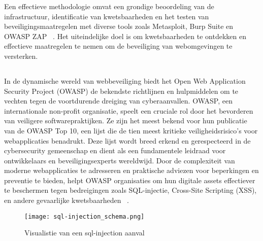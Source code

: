 Een effectieve methodologie omvat een grondige beoordeling van de infrastructuur, identificatie van kwetsbaarheden en het 
testen van beveiligingsmaatregelen met diverse tools zoals Metasploit, Burp Suite en OWASP ZAP ~\autocite{Ravindran2022}. 
Het uiteindelijke doel is om kwetsbaarheden te ontdekken en effectieve maatregelen te nemen om de beveiliging van webomgevingen 
te versterken.

\subsection{}
\label{sec:Aanvallen op veiligheidskwetsbaarheden in Webomgevingen}
In de dynamische wereld van webbeveiliging biedt het Open Web Application Security Project (OWASP) de bekendste richtlijnen en hulpmiddelen om te vechten 
tegen de voortdurende dreiging van cyberaanvallen. OWASP, een internationale non-profit organisatie, speelt een cruciale rol door het bevorderen van 
veiligere softwarepraktijken. Ze zijn het meest bekend voor hun publicatie van de OWASP Top 10, een lijst die de tien meest kritieke veiligheidsrisico's 
voor webapplicaties benadrukt. Deze lijst wordt breed erkend en gerespecteerd in de cybersecurity gemeenschap en dient als een fundamentele leidraad 
voor ontwikkelaars en beveiligingsexperts wereldwijd. Door de complexiteit van moderne webapplicaties te adresseren en praktische adviezen voor 
beperkingen en preventie te bieden, helpt OWASP organisaties om hun digitale assets effectiever te beschermen tegen bedreigingen zoals SQL-injectie, 
Cross-Site Scripting (XSS), en andere gevaarlijke kwetsbaarheden ~\autocite{Priyawati2022}.
\begin{figure}
    \centering
    \texttt{[image: sql-injection\_schema.png]}
    \caption[Visualisatie van een sql-injection aanval]{Visualistie van een sql-injection aanval}
\end{figure}
\subsubsection{}
\label{sec:SQL-injectie}

